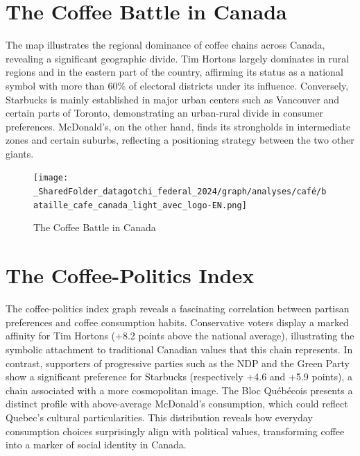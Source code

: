 \documentclass[
  letterpaper,
  DIV=11,
  numbers=noendperiod]{scrartcl}
\begin{document}
\setcounter{page}{1}

\section{The Coffee Battle in Canada}\label{the-coffee-battle-in-canada}

The map illustrates the regional dominance of coffee chains across
Canada, revealing a significant geographic divide. Tim Hortons largely
dominates in rural regions and in the eastern part of the country,
affirming its status as a national symbol with more than 60\% of
electoral districts under its influence. Conversely, Starbucks is mainly
established in major urban centers such as Vancouver and certain parts
of Toronto, demonstrating an urban-rural divide in consumer preferences.
McDonald's, on the other hand, finds its strongholds in intermediate
zones and certain suburbs, reflecting a positioning strategy between the
two other giants.

\begin{figure}[H]

{\centering \texttt{[image: \_SharedFolder\_datagotchi\_federal\_2024/graph/analyses/café/bataille\_cafe\_canada\_light\_avec\_logo-EN.png]}

}

\caption{The Coffee Battle in Canada}

\end{figure}%

\section{The Coffee-Politics Index}\label{the-coffee-politics-index}

The coffee-politics index graph reveals a fascinating correlation
between partisan preferences and coffee consumption habits. Conservative
voters display a marked affinity for Tim Hortons (+8.2 points above the
national average), illustrating the symbolic attachment to traditional
Canadian values that this chain represents. In contrast, supporters of
progressive parties such as the NDP and the Green Party show a
significant preference for Starbucks (respectively +4.6 and +5.9
points), a chain associated with a more cosmopolitan image. The Bloc
Québécois presents a distinct profile with above-average McDonald's
consumption, which could reflect Quebec's cultural particularities. This
distribution reveals how everyday consumption choices surprisingly align
with political values, transforming coffee into a marker of social
identity in Canada.
\end{document}

